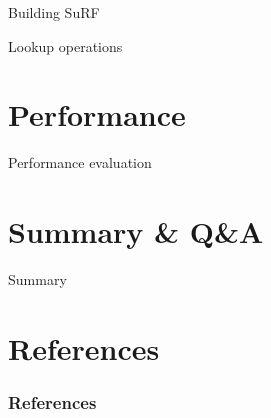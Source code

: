 \documentclass{beamer}
\begin{document}
\begin{frame}{Building SuRF}
\end{frame}

\begin{frame}{Lookup operations}
\end{frame}

\section{Performance}

\begin{frame}{Performance evaluation}
\end{frame}

\section{Summary \& Q\&A}

\begin{frame}{Summary}
\end{frame}

\section{References}

\begin{frame}[allowframebreaks]
		\frametitle{References}
		\printbibliography
\end{frame}
\end{document}
